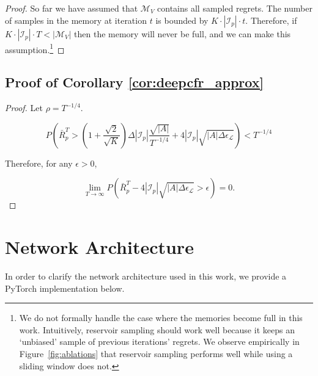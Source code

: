 \documentclass{article}
\begin{document}
\begin{proof}
So far we have assumed that $\mathcal{M}_V$ contains all sampled regrets. The number of samples in the memory at iteration $t$ is bounded by $K \cdot |\mathcal{I}_p| \cdot t$. Therefore, if $K \cdot |\mathcal{I}_p| \cdot T < |\mathcal{M}_V|$ then the memory will never be full, and we can make this assumption.\footnote{We do not formally handle the case where the memories become full in this work. Intuitively, reservoir sampling should work well because it keeps an `unbiased' sample of previous iterations' regrets. We observe empirically in Figure~\ref{fig:ablations} that reservoir sampling performs well while using a sliding window does not.}
\end{proof}

\subsection{Proof of Corollary \ref{cor:deepcfr_approx}}

\begin{proof}
Let $\rho = T^{-1/4}$. 

\begin{equation}
       P\left(\bar{R}_p^T > \left( 1 + \frac{\sqrt{2}}{\sqrt{K}} \right) \Delta |\mathcal{I}_p| \frac{\sqrt{|A|}}{T^{-1/4}} +  4 |\mathcal{I}_p| \sqrt{|A| \Delta \epsilon_\mathcal{L}} \right) < T^{-1/4}
\end{equation}

Therefore, for any $\epsilon > 0$,

\begin{equation}
       \lim_{T\to \infty} P\left(\bar{R}_p^T - 4 |\mathcal{I}_p| \sqrt{|A| \Delta \epsilon_\mathcal{L}} >  \epsilon \right) = 0.
\end{equation}
\end{proof}

\newpage

\section{Network Architecture}

\label{app:network}
In order to clarify the network architecture used in this work, we provide a PyTorch \cite{Paszke17:Automatic} implementation  below.
\end{document}
